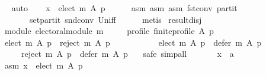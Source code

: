 \begin{isabellebody}
\ \ \ \ \isamarkupfalse%
\ auto\isanewline
\ \ \isamarkupfalse%
\ {\isachardoublequoteopen}x\ {\isasymin}\ elect\ m\ A\ p{\isachardoublequoteclose}\isanewline
\ \ \ \ \isamarkupfalse%
\ asm{}\ asm{}\ asm{}\ fst{\isacharunderscore}{\kern0pt}conv\ partit\isanewline
\ \ \ \ \ \ \ \ \ \ set{\isacharunderscore}{\kern0pt}partit\ snd{\isacharunderscore}{\kern0pt}conv\ Un{\isacharunderscore}{\kern0pt}iff\isanewline
\ \ \ \ \isamarkupfalse%
\ metis\isanewline
{}\isamarkupfalse%
%
\endisatagproof
{\isafoldproof}%
%
\isadelimproof
\isanewline
%
\endisadelimproof
\isanewline
{}\isamarkupfalse%
\ result{\isacharunderscore}{\kern0pt}disj{\isacharcolon}{\kern0pt}\isanewline
\ \ \isanewline
\ \ \ \ module{\isacharcolon}{\kern0pt}\ {\isachardoublequoteopen}electoral{\isacharunderscore}{\kern0pt}module\ m{\isachardoublequoteclose}\ \isanewline
\ \ \ \ profile{\isacharcolon}{\kern0pt}\ {\isachardoublequoteopen}finite{\isacharunderscore}{\kern0pt}profile\ A\ p{\isachardoublequoteclose}\isanewline
\ \ \isanewline
\ \ \ \ {\isachardoublequoteopen}{\isacharparenleft}{\kern0pt}elect\ m\ A\ p{\isacharparenright}{\kern0pt}\ {\isasyminter}\ {\isacharparenleft}{\kern0pt}reject\ m\ A\ p{\isacharparenright}{\kern0pt}\ {\isacharequal}{\kern0pt}\ {\isacharbraceleft}{\kern0pt}{\isacharbraceright}{\kern0pt}\ {\isasymand}\isanewline
\ \ \ \ \ \ \ \ {\isacharparenleft}{\kern0pt}elect\ m\ A\ p{\isacharparenright}{\kern0pt}\ {\isasyminter}\ {\isacharparenleft}{\kern0pt}defer\ m\ A\ p{\isacharparenright}{\kern0pt}\ {\isacharequal}{\kern0pt}\ {\isacharbraceleft}{\kern0pt}{\isacharbraceright}{\kern0pt}\ {\isasymand}\isanewline
\ \ \ \ \ \ \ \ {\isacharparenleft}{\kern0pt}reject\ m\ A\ p{\isacharparenright}{\kern0pt}\ {\isasyminter}\ {\isacharparenleft}{\kern0pt}defer\ m\ A\ p{\isacharparenright}{\kern0pt}\ {\isacharequal}{\kern0pt}\ {\isacharbraceleft}{\kern0pt}{\isacharbraceright}{\kern0pt}{\isachardoublequoteclose}\isanewline
%
\isadelimproof
%
\endisadelimproof
%
\isatagproof
{}\isamarkupfalse%
\ {\isacharparenleft}{\kern0pt}safe{\isacharcomma}{\kern0pt}\ simp{\isacharunderscore}{\kern0pt}all{\isacharparenright}{\kern0pt}\isanewline
\ \ \isamarkupfalse%
\isanewline
\ \ \ \ x\ {\isacharcolon}{\kern0pt}{\isacharcolon}{\kern0pt}\ {\isachardoublequoteopen}{\isacharprime}{\kern0pt}a{\isachardoublequoteclose}\isanewline
\ \ \isamarkupfalse%
\isanewline
\ \ \ \ asm{}{\isacharcolon}{\kern0pt}\ {\isachardoublequoteopen}x\ {\isasymin}\ elect\ m\ A\ p{\isachardoublequoteclose}\ \isanewline

\end{isabellebody}
